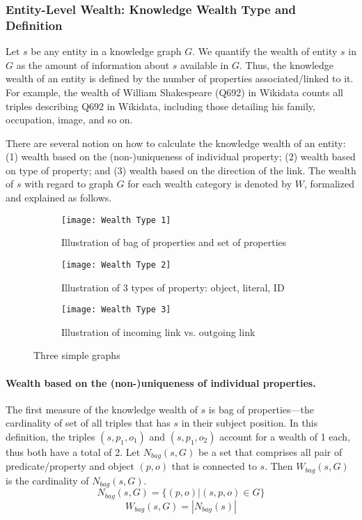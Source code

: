 \subsubsection{Entity-Level Wealth: Knowledge Wealth Type and Definition}

Let \(s\) be any entity in a knowledge graph \(G\). We quantify the wealth of entity \(s\) in \(G\) as the amount of information about \(s\) available in \(G\). Thus, the knowledge wealth of an entity is defined by the number of properties associated/linked to it. For example, the wealth of William Shakespeare (Q692) in Wikidata counts all triples describing Q692 in Wikidata, including those detailing his family, occupation, image, and so on.

There are several notion on how to calculate the knowledge wealth of an entity: (1) wealth based on the (non-)uniqueness of individual property; (2) wealth based on type of property; and (3) wealth based on the direction of the link. The wealth of \(s\) with regard to graph \(G\) for each wealth category is denoted by \(W\), formalized and explained as follows.

\begin{figure}[!h]
    \centering
    \begin{subfigure}[b]{0.3\textwidth}
        \centering
        \texttt{[image: Wealth Type 1]}
        \caption{Illustration of bag of properties and set of properties} \label{fig:wealth-type1}
    \end{subfigure}
    \hfill
    \begin{subfigure}[b]{0.3\textwidth}
        \centering
        \texttt{[image: Wealth Type 2]}
        \caption{Illustration of 3 types of property: object, literal, ID} \label{fig:wealth-type2}
    \end{subfigure}
    \hfill
    \begin{subfigure}[b]{0.3\textwidth}
        \centering
        \texttt{[image: Wealth Type 3]}
        \caption{Illustration of incoming link vs. outgoing link} \label{fig:wealth-type3}
    \end{subfigure}
    \caption{Three simple graphs} \label{fig:three graphs}
\end{figure}

\paragraph{Wealth based on the (non-)uniqueness of individual properties.}
The first measure of the knowledge wealth of \(s\) is bag of properties---the cardinality of set of all triples that has \(s\) in their subject position. In this definition, the triples \((s, p_1, o_1)\) and \((s, p_1, o_2)\) account for a wealth of 1 each, thus both have a total of 2.
Let \(N_{bag}(s,G)\) be a set that comprises all pair of predicate/property and object \((p,o)\) that is connected to \(s\). Then \(W_{bag}(s, G)\) is the cardinality of \(N_{bag}(s,G)\).
\[
    N_{bag}(s,G) = \{(p, o) | (s, p, o) \in G\}
\]
\[
    W_{bag}(s,G) = |N_{bag}(s)|
\]

